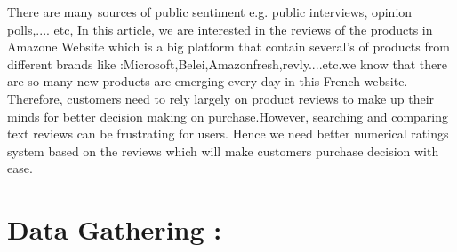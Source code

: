 \documentclass{article}
\begin{document}
There are many sources of public sentiment e.g. public interviews, opinion polls,.... etc, In this article, we are interested in the reviews of the products in  Amazone Website which is a big platform that contain several's of products from different brands like :Microsoft,Belei,Amazonfresh,revly....etc.we know that there are so many new products are emerging every day in this French website. Therefore, customers need to rely largely on product reviews to make up their minds for better decision making on purchase.However, searching and comparing text reviews can be frustrating for users. Hence we need better numerical ratings system based on the reviews which will make customers purchase decision with ease.




\section{Data Gathering :}
\end{document}
